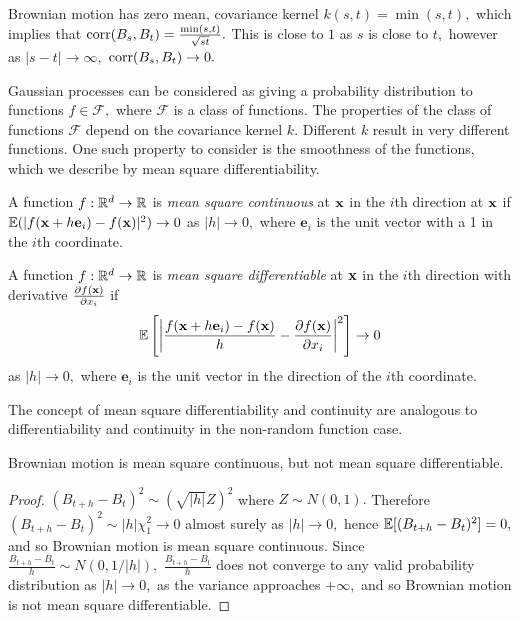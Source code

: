 Brownian motion has zero mean, covariance kernel $k(s, t) = \min(s, t),$ which
implies that $\operatorname{corr}(B_s, B_t) = \frac{\min(s, t)}{\sqrt{st}}.$ This is close to
$1$ as $s$ is close to $t,$ however as $|s-t|\to\infty,$
$\operatorname{corr}(B_s, B_t) \to 0.$

Gaussian processes can be considered as giving a probability distribution to
functions $f\in\mathcal{F},$ where $\mathcal{F}$ is a class of functions.
The properties of the class of functions
$\mathcal{F}$ depend on the covariance kernel $k.$ Different $k$ result
in very different functions. One such property to consider is the smoothness of
the functions, which we describe by mean square differentiability.

\begin{definition}\label{def:MSC}
    A function $f:\mathbb{R}^d\to\mathbb{R}$ is \emph{mean square continuous} at $\mathbf{x}$
    in the $i$th direction at $\mathbf{x}$ if
    $\operatorname{\mathbb{E}}(|f(\mathbf{x} + h\mathbf{e}_i) - f(\mathbf{x})|^2)\to 0$ as $|h|\to 0,$
    where $\mathbf{e}_i$ is the unit vector with a 1 in the $i$th coordinate.
\end{definition}

\begin{definition}
    A function $f:\mathbb{R}^d\to\mathbb{R}$ is \emph{mean square differentiable} at
    $\mathbf{x}$ in the $i$th direction with derivative
    $\frac{\partial f(\mathbf{x})}{\partial x_i}$ if
    $$
        \operatorname{\mathbb{E}}\left[
            \left|
            \frac{f(\mathbf{x} + h\mathbf{e}_i) - f(\mathbf{x})}{h}
            - \frac{\partial f(\mathbf{x})}{\partial x_i}
            \right|^2
            \right]\to 0
    $$ as $|h|\to 0,$ where $\mathbf{e}_i$ is the unit vector in the direction
    of the $i$th coordinate.
\end{definition}

The concept of mean square differentiability and continuity are analogous to
differentiability and continuity in the non-random function case.

\begin{theorem}
    Brownian motion is mean square continuous, but not mean square
    differentiable.
\end{theorem}
\begin{proof}
    $(B_{t + h} - B_t)^2 \sim (\sqrt{|h|}Z)^2$ where $Z\sim N(0,1).$ Therefore
    $(B_{t + h} - B_t)^2 \sim |h|\chi_1^2 \to 0$ almost surely as $|h|\to 0,$
    hence $\operatorname{\mathbb{E}}[(B_{t + h} - B_t)^2] = 0,$ and so Brownian motion is
    mean square continuous. Since
    $\frac{B_{t + h} - B_t}{h} \sim N(0, 1/|h|),$ $\frac{B_{t + h} - B_t}{h}$
    does not converge to any valid probability distribution as $|h| \to 0,$ as
    the variance approaches $+\infty,$ and so Brownian motion is not
    mean square differentiable.
\end{proof}

